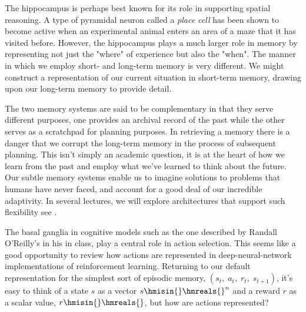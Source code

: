 The hippocampus is perhaps best known for its role in supporting spatial reasoning. A type of pyramidal neuron called a {\it{place cell}} has been shown to become active when an experimental animal enters an area of a maze that it has visited before. However, the hippocampus plays a much larger role in memory by representing not just the "where" of experience but also the "when". The manner in which we employ short- and long-term memory is very different. We might construct a representation of our current situation in short-term memory, drawing upon our long-term memory to provide detail. 

The two memory systems are said to be complementary in that they serve different purposes, one provides an archival record of the past while the other serves as a scratchpad for planning purposes. In retrieving a memory there is a danger that we corrupt the long-term memory in the process of subsequent planning. This isn't simply an academic question, it is at the heart of how we learn from the past and employ what we've learned to think about the future. Our subtle memory systems enable us to imagine solutions to problems that humans have never faced, and account for a good deal of our incredible adaptivity. In several lectures, we will explore architectures that support such flexibility \emdash{} see {{}}.




The basal ganglia in cognitive models such as the one described by Randall O'Reilly's in his {} in class, play a central role in action selection. This seems like a good opportunity to review how actions are represented in deep-neural-network implementations of reinforcement learning. Returning to our default representation for the simplest sort of episodic memory, $(s_{t},\;a_{t},\;r_{t},\;s_{t+1})$, it’s easy to think of a state $s$ as a vector $s \hmisin{} \hmreals{}^{n}$ and a reward $r$ as a scalar value, $r \hmisin{} \hmreals{}$, but how are actions represented?

